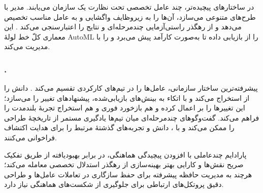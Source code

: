 \subsubsection{\protect{}}
در ساختارهای پیچیده‌تر، چند عامل تخصصی تحت نظارت یک  سازمان می‌یابند. مدیر با  طرح‌های متنوعی می‌سازد، آن‌ها را به زیروظایف  واگشایی و به عامل مناسب تخصیص می‌دهد و از رهگذر راستی‌آزمایی چندمرحله‌ای و  نتایج را اعتبارسنجی می‌کند \cite{trirat2025automlagent}. این معماری کلّ خط لولهٔ AutoML را از بازیابی داده تا  به‌صورت کارآمد پیش می‌برد و  را با  مدیریت می‌کند.

\subsubsection{\protect{}.}
پیشرفته‌ترین ساختار سازمانی، عامل‌ها را در تیم‌های کارکردی تقسیم می‌کند \cite{Yang2025NADER}.  دانش را از  استخراج می‌کند و با اتکاء به بینش‌های بازیابی‌شده، پیشنهادهای تغییر را می‌سازد؛  این تغییرها را بر  اعمال کرده و هم بازخورد فوری و هم استخراج تجربهٔ بلندمدت را فراهم می‌کند. گفت‌وگوهای چندمرحله‌ای میان تیم‌ها یادگیری مستمر از تاریخچهٔ طراحی را ممکن می‌کند و  با ، دانش و تجربه‌های گذشتهٔ مرتبط را برای هدایت اکتشاف فراخوانی می‌کنند.

پارادایم چندعاملی با افزودن پیچیدگی هماهنگی، در برابر  بهبود‌یافته از طریق تفکیک صریح نقش‌ها و کارایی بهتر بهینه‌سازی از رهگذر استدلال تخصصی معامله می‌کند؛ هرچند به مدیریت حافظه پیشرفته برای حفظ سازگاری در تعاملات عامل‌ها و طراحی دقیق پروتکل‌های ارتباطی برای جلوگیری از شکست‌های هماهنگی نیاز دارد.
